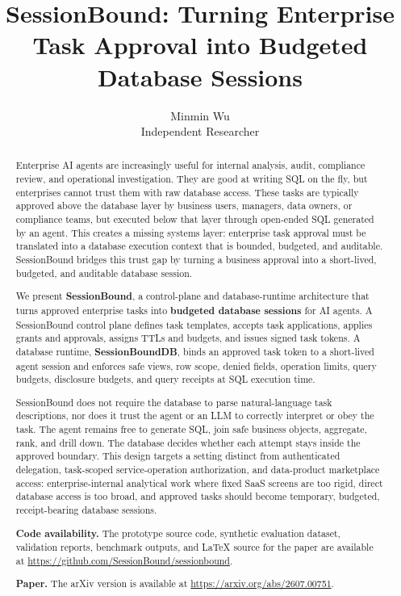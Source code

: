 \documentclass[
]{article}
\title{SessionBound: Turning Enterprise Task Approval into Budgeted
Database Sessions}
\author{Minmin Wu\\
Independent Researcher}
\date{}
\begin{document}
\maketitle

\begin{abstract}

Enterprise AI agents are increasingly useful for internal analysis,
audit, compliance review, and operational investigation. They are good
at writing SQL on the fly, but enterprises cannot trust them with raw
database access. These tasks are typically approved above the database
layer by business users, managers, data owners, or compliance teams, but
executed below that layer through open-ended SQL generated by an agent.
This creates a missing systems layer: enterprise task approval must be
translated into a database execution context that is bounded, budgeted,
and auditable. SessionBound bridges this trust gap by turning a business
approval into a short-lived, budgeted, and auditable database session.

We present \textbf{SessionBound}, a control-plane and database-runtime
architecture that turns approved enterprise tasks into \textbf{budgeted
database sessions} for AI agents. A SessionBound control plane defines
task templates, accepts task applications, applies grants and approvals,
assigns TTLs and budgets, and issues signed task tokens. A database
runtime, \textbf{SessionBoundDB}, binds an approved task token to a
short-lived agent session and enforces safe views, row scope, denied
fields, operation limits, query budgets, disclosure budgets, and query
receipts at SQL execution time.

SessionBound does not require the database to parse natural-language
task descriptions, nor does it trust the agent or an LLM to correctly
interpret or obey the task. The agent remains free to generate SQL, join
safe business objects, aggregate, rank, and drill down. The database
decides whether each attempt stays inside the approved boundary. This
design targets a setting distinct from authenticated delegation,
task-scoped service-operation authorization, and data-product
marketplace access: enterprise-internal analytical work where fixed SaaS
screens are too rigid, direct database access is too broad, and approved
tasks should become temporary, budgeted, receipt-bearing database
sessions.

\textbf{Code availability.} The prototype source code, synthetic
evaluation dataset, validation reports, benchmark outputs, and LaTeX
source for the paper are available at
\url{https://github.com/SessionBound/sessionbound}.
\par\noindent\textbf{Paper.} The arXiv version is available at
\url{https://arxiv.org/abs/2607.00751}.
\end{abstract}
\end{document}
